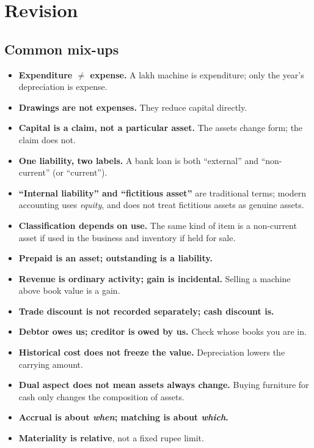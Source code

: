 \documentclass[11pt,a4paper]{article}
\newcommand{\Rs}{\ifmmode\text{\rsfont ₹}\else{\rsfont ₹}\fi}
\begin{document}
\section{Revision}

\subsection{Common mix-ups}

\begin{impbox}
\begin{itemize}
  \item \textbf{Expenditure $\neq$ expense.} A \Rs 6 lakh machine is expenditure; only the year's depreciation is expense.
  \item \textbf{Drawings are not expenses.} They reduce capital directly.
  \item \textbf{Capital is a claim, not a particular asset.} The assets change form; the claim does not.
  \item \textbf{One liability, two labels.} A bank loan is both ``external'' and ``non-current'' (or ``current'').
  \item \textbf{``Internal liability'' and ``fictitious asset''} are traditional terms; modern accounting uses \emph{equity}, and does not treat fictitious assets as genuine assets.
  \item \textbf{Classification depends on use.} The same kind of item is a non-current asset if used in the business and inventory if held for sale.
  \item \textbf{Prepaid is an asset; outstanding is a liability.}
  \item \textbf{Revenue is ordinary activity; gain is incidental.} Selling a machine above book value is a gain.
  \item \textbf{Trade discount is not recorded separately; cash discount is.}
  \item \textbf{Debtor owes us; creditor is owed by us.} Check whose books you are in.
  \item \textbf{Historical cost does not freeze the value.} Depreciation lowers the carrying amount.
  \item \textbf{Dual aspect does not mean assets always change.} Buying furniture for cash only changes the composition of assets.
  \item \textbf{Accrual is about \emph{when}; matching is about \emph{which}.}
  \item \textbf{Materiality is relative}, not a fixed rupee limit.
\end{itemize}
\end{impbox}
\end{document}
